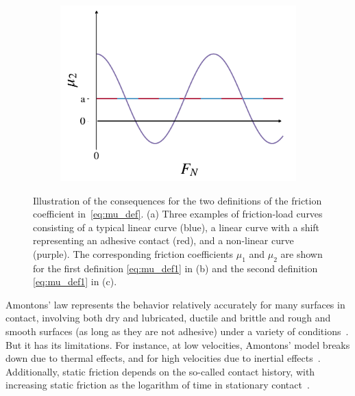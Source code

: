 \begin{figure}[H]
\begin{subfigure}[t]{0.32\textwidth}
      \caption{}
      \label{fig:fric_coef_example_b}
    \end{subfigure}
    \hfill
    \begin{subfigure}[t]{0.32\textwidth}
      \centering
      \includegraphics[width=\textwidth]{figures/theory/fric_coef_example_c.pdf}
      \caption{}
      \label{fig:fric_coef_example_c}
  \end{subfigure}
  \hfill
  \caption{Illustration of the consequences for the two definitions of the friction coefficient in~\cref{eq:mu_def}. (a) Three examples of friction-load curves consisting of a typical linear curve (blue), a linear curve with a shift representing an adhesive contact (red), and a non-linear curve (purple). The corresponding friction coefficients $\mu_1$ and $\mu_2$ are shown for the first definition \cref{eq:mu_def1} in (b) and the second definition \cref{eq:mu_def1} in (c).}
  \label{fig:fric_coef_example}
\end{figure}


Amontons’ law represents the behavior relatively accurately for many surfaces in contact, involving both dry and lubricated, ductile and brittle and rough and smooth surfaces (as long as they are not adhesive) under a variety of conditions~\cite{gao_frictional_2004}. But it has its limitations. For instance, at low velocities, Amontons' model breaks down due to thermal effects, and for high velocities due to inertial effects~\cite[pp.\ 5--6]{gnecco_meyer_2015}. Additionally, static friction depends on the so-called contact history, with increasing static friction as the logarithm of time in stationary contact~\cite{dieterich_1972}.

